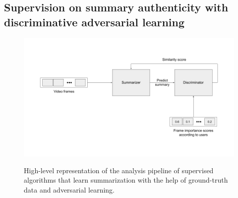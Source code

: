 \subsection{Supervision on summary authenticity with discriminative adversarial learning}
\label{subsec:rel-sup-discriminative}

\begin{figure}[ht]
  \caption{High-level representation of the analysis pipeline of supervised algorithms that learn summarization with the help of ground-truth data and adversarial learning.}
  \includegraphics[width=0.73\paperwidth]{content/related/figures/sup-gan.png}
  \label{figure:rel-sup-gan}
\end{figure}

